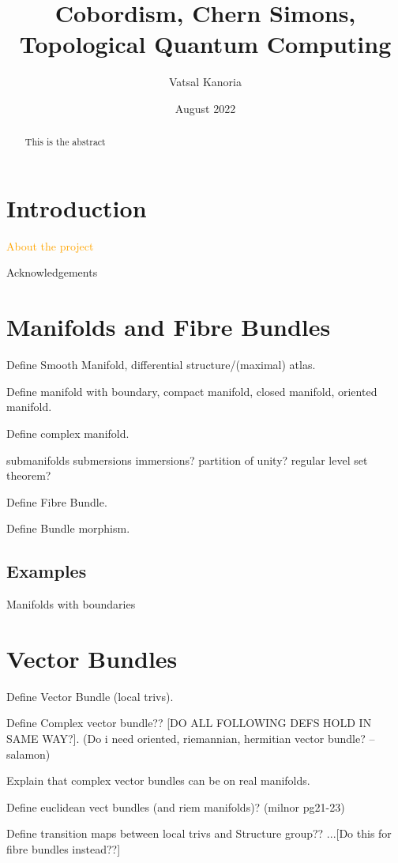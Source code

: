 \documentclass[a4paper]{article}
\theoremstyle{definition} \newtheorem*{definition}{Definition}
\theoremstyle{definition} \newtheorem*{definitions}{Definitions}
\theoremstyle{plain} \newtheorem{theorem}{Theorem}[section]
\theoremstyle{plain} \newtheorem{proposition}[theorem]{Proposition}
\theoremstyle{plain} \newtheorem{corollary}[theorem]{Corollary}
\theoremstyle{plain} \newtheorem{lemma}[theorem]{Lemma}
\theoremstyle{plain} \newtheorem{example}[theorem]{Example}
\newcommand{\finish}[1]{\textcolor{orange}{#1}}
\begin{document}
\title{Cobordism, Chern Simons, Topological Quantum Computing}
\author{Vatsal Kanoria}
\date{August 2022}
\maketitle
\begin{abstract}
This is the abstract
\end{abstract}
\tableofcontents

\section{Introduction}

\finish{About the project}

Acknowledgements

\section{Manifolds and Fibre Bundles}

Define Smooth Manifold, differential structure/(maximal) atlas.

Define manifold with boundary, compact manifold, closed manifold, oriented manifold.

Define complex manifold.

submanifolds submersions immersions? partition of unity? regular level set theorem?

Define Fibre Bundle.

Define Bundle morphism.

\subsection{Examples}

Manifolds with boundaries

\section{Vector Bundles}

Define Vector Bundle (local trivs).

Define Complex vector bundle?? [DO ALL FOLLOWING DEFS HOLD IN SAME WAY?]. (Do i need oriented, riemannian, hermitian vector bundle? -- salamon)

Explain that complex vector bundles can be on real manifolds.

Define euclidean vect bundles (and riem manifolds)? (milnor pg21-23)

Define transition maps between local trivs and Structure group?? ...[Do this for fibre bundles instead??]
\end{document}
